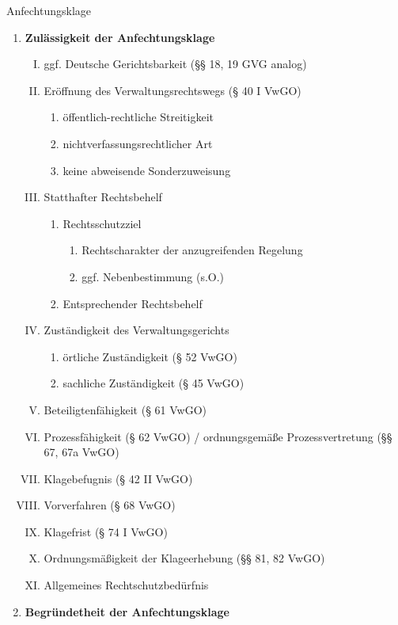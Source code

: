 \documentclass{article}
\begin{document}
\begin{schemata}{Anfechtungsklage}
\begin{enumerate}[\textbf{A.}]
   \item \textbf{Zulässigkeit der Anfechtungsklage}
   \begin{enumerate}[I.]
        \item ggf. Deutsche Gerichtsbarkeit (§§ 18, 19 GVG analog)
        \item Eröffnung des Verwaltungsrechtswegs (§ 40 I VwGO)
        \begin{enumerate}[1.]
            \item öffentlich-rechtliche Streitigkeit
            \item nichtverfassungsrechtlicher Art
            \item keine abweisende Sonderzuweisung
        \end{enumerate}
        \item Statthafter Rechtsbehelf
        \begin{enumerate}[1.]
            \item Rechtsschutzziel
            \begin{enumerate}
                \item Rechtscharakter der anzugreifenden Regelung
                \item ggf. Nebenbestimmung (s.O.)
            \end{enumerate}
            \item Entsprechender Rechtsbehelf
        \end{enumerate}
        \item Zuständigkeit des Verwaltungsgerichts
        \begin{enumerate}[1.]
            \item örtliche Zuständigkeit (§ 52 VwGO)
            \item sachliche Zuständigkeit (§ 45 VwGO)
        \end{enumerate}
        \item Beteiligtenfähigkeit (§ 61 VwGO)
        \item Prozessfähigkeit (§ 62 VwGO) / ordnungsgemäße Prozessvertretung (§§ 67, 67a VwGO)
        \item Klagebefugnis (§ 42 II VwGO)
        \item Vorverfahren (§ 68 VwGO)
        \item Klagefrist (§ 74 I VwGO)
        \item Ordnungsmäßigkeit der Klageerhebung (§§ 81, 82 VwGO)
        \item Allgemeines Rechtschutzbedürfnis
   \end{enumerate}
   \item \textbf{Begründetheit der Anfechtungsklage}
 \end{enumerate}
\end{schemata}
\end{document}

